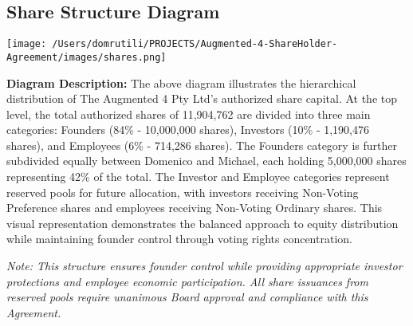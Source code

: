 \subsection*{Share Structure Diagram}

\begin{center}
\texttt{[image: /Users/domrutili/PROJECTS/Augmented-4-ShareHolder-Agreement/images/shares.png]}
\end{center}

\textbf{Diagram Description:} The above diagram illustrates the hierarchical distribution of The Augmented 4 Pty Ltd's authorized share capital. At the top level, the total authorized shares of 11,904,762 are divided into three main categories: Founders (84\% - 10,000,000 shares), Investors (10\% - 1,190,476 shares), and Employees (6\% - 714,286 shares). The Founders category is further subdivided equally between Domenico and Michael, each holding 5,000,000 shares representing 42\% of the total. The Investor and Employee categories represent reserved pools for future allocation, with investors receiving Non-Voting Preference shares and employees receiving Non-Voting Ordinary shares. This visual representation demonstrates the balanced approach to equity distribution while maintaining founder control through voting rights concentration.

\textit{Note: This structure ensures founder control while providing appropriate investor protections and employee economic participation. All share issuances from reserved pools require unanimous Board approval and compliance with this Agreement.} 